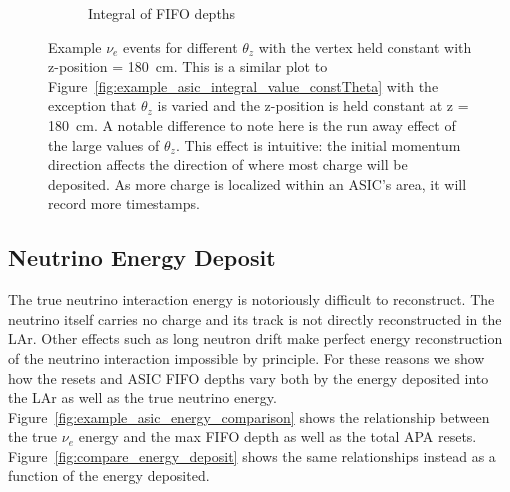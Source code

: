 \begin{figure}
\begin{subfigure}{.5\textwidth}
  \caption{Integral of FIFO depths}
\end{subfigure}
\caption{Example $\nu_{e}$ events for different $\theta_{z}$ with the vertex held constant with z-position = 180~\unit{cm}.
This is a similar plot to Figure~\ref{fig:example_asic_integral_value_constTheta} with the exception that $\theta_{z}$ is varied and the z-position is held constant at z = 180~\unit{cm}.
A notable difference to note here is the run away effect of the large values of $\theta_{z}$.
This effect is intuitive: the initial momentum direction affects the direction of where most charge will be deposited.
As more charge is localized within an ASIC's area, it will record more timestamps. 
}
\label{fig:example_asic_integral_value_constZpos}
\end{figure}

\subsection{Neutrino Energy Deposit}
\label{sec:neutrino_energy_analysis}
The true neutrino interaction energy is notoriously difficult to reconstruct.
The neutrino itself carries no charge and its track is not directly reconstructed in the LAr.
Other effects such as long neutron drift make perfect energy reconstruction of the neutrino interaction impossible by principle.
For these reasons we show how the resets and ASIC FIFO depths vary both by the energy deposited into the LAr as well as the true neutrino energy.
Figure~\ref{fig:example_asic_energy_comparison} shows the relationship between the true $\nu_{e}$ energy and the max FIFO depth as well as the total APA resets.
Figure~\ref{fig:compare_energy_deposit} shows the same relationships instead as a function of the energy deposited.

